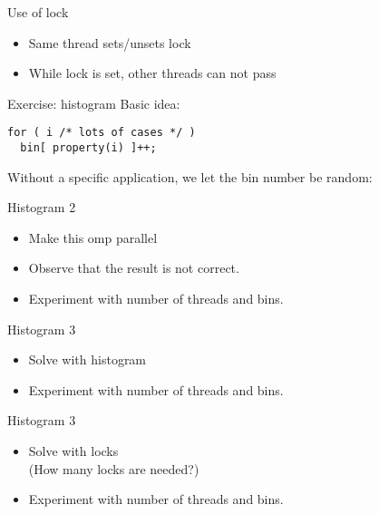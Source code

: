 \begin{numberedframe}{Use of lock}
  \begin{itemize}
  \item Same thread sets/unsets lock
  \item While lock is set, other threads can not pass
  \end{itemize}
\end{numberedframe}

\begin{numberedframe}{Exercise: histogram}
  Basic idea:
\begin{lstlisting}
for ( i /* lots of cases */ )
  bin[ property(i) ]++;
\end{lstlisting}
Without a specific application, we let the bin number
be random:
\end{numberedframe}

\begin{numberedframe}{Histogram 2}
  \begin{itemize}
  \item Make this omp parallel
  \item Observe that the result is not correct.
  \item   Experiment with number of threads and bins.
  \end{itemize}
\end{numberedframe}

\begin{numberedframe}{Histogram 3}
  \begin{itemize}
  \item Solve with histogram
  \item Experiment with number of threads and bins.
  \end{itemize}
\end{numberedframe}

\begin{numberedframe}{Histogram 3}
  \begin{itemize}
  \item Solve with locks\\
    (How many locks are needed?)
  \item Experiment with number of threads and bins.
  \end{itemize}
\end{numberedframe}

\endinput

\begin{numberedframe}{}
  \begin{itemize}
  \item 
  \end{itemize}
\end{numberedframe}

